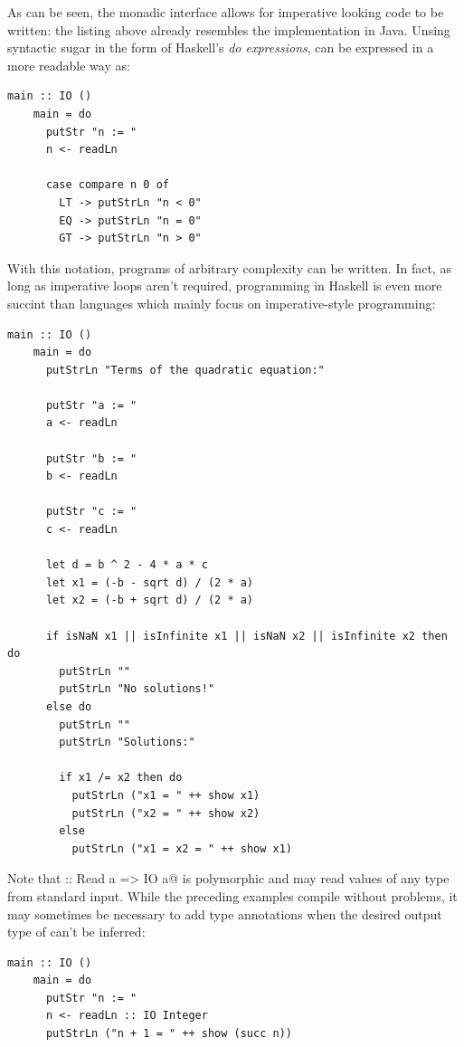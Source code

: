 \documentclass[UdineBachThesis,american,11pt,draft]{PhdThesis}
\begin{document}
  As can be seen, the monadic interface allows for imperative looking code to be
  written: the listing above already resembles the implementation in Java.
  Unsing syntactic sugar in the form of Haskell's \emph{do expressions},
  \lstinline@main@ can be expressed in a more readable way as:

  \begin{lstlisting}[gobble=4,basicstyle=\ttfamily\small]
    main :: IO ()
    main = do
      putStr "n := "
      n <- readLn

      case compare n 0 of
        LT -> putStrLn "n < 0"
        EQ -> putStrLn "n = 0"
        GT -> putStrLn "n > 0"
  \end{lstlisting}

  With this notation, programs of arbitrary complexity can be written. In fact,
  as long as imperative loops aren't required, programming in Haskell is even
  more succint than languages which mainly focus on imperative-style
  programming:

  \begin{lstlisting}[gobble=4,basicstyle=\ttfamily\small]
    main :: IO ()
    main = do
      putStrLn "Terms of the quadratic equation:"

      putStr "a := "
      a <- readLn

      putStr "b := "
      b <- readLn

      putStr "c := "
      c <- readLn

      let d = b ^ 2 - 4 * a * c
      let x1 = (-b - sqrt d) / (2 * a)
      let x2 = (-b + sqrt d) / (2 * a)

      if isNaN x1 || isInfinite x1 || isNaN x2 || isInfinite x2 then do
        putStrLn ""
        putStrLn "No solutions!"
      else do
        putStrLn ""
        putStrLn "Solutions:"

        if x1 /= x2 then do
          putStrLn ("x1 = " ++ show x1)
          putStrLn ("x2 = " ++ show x2)
        else
          putStrLn ("x1 = x2 = " ++ show x1)
  \end{lstlisting}

  Note that \lstinline@readLn :: Read a => IO a@ is polymorphic and may read
  values of any type from standard input. While the preceding examples compile
  without problems, it may sometimes be necessary to add type annotations when
  the desired output type of \lstinline@readLn@ can't be inferred:

  \begin{lstlisting}[gobble=4,basicstyle=\ttfamily\small]
    main :: IO ()
    main = do
      putStr "n := "
      n <- readLn :: IO Integer
      putStrLn ("n + 1 = " ++ show (succ n))
  \end{lstlisting}
\end{document}
